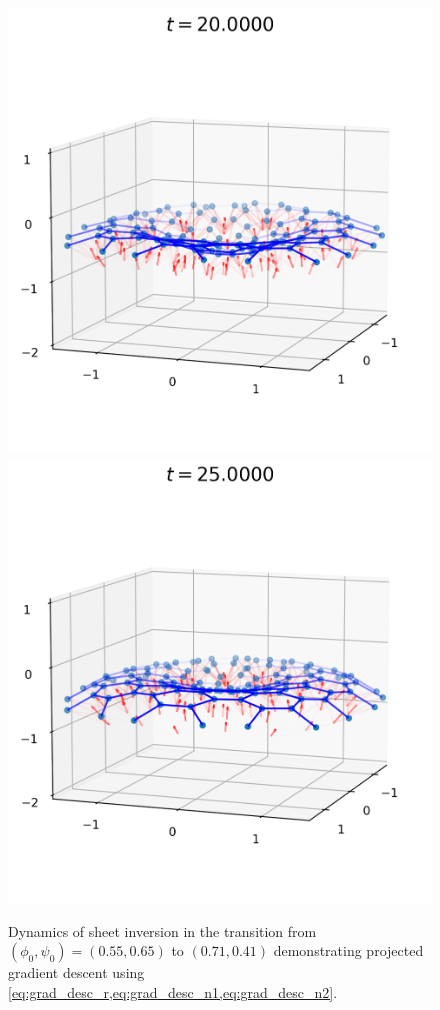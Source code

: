 \begin{landscape}
\begin{figure}[p]
	\includegraphics[width=0.4\textheight]{dynamics/08000.png}
	\includegraphics[width=0.4\textheight]{dynamics/10000.png}
	\caption[Gradient descent equilibration and dynamics of sheet inversion]{Dynamics of sheet inversion in the transition from $(\phi_0, \psi_0)=(0.55, 0.65)$ to $(0.71,0.41)$ demonstrating projected gradient descent using \cref{eq:grad_desc_r,eq:grad_desc_n1,eq:grad_desc_n2}.}
	\label{fig:dynamics}
\end{figure}
\end{landscape}


